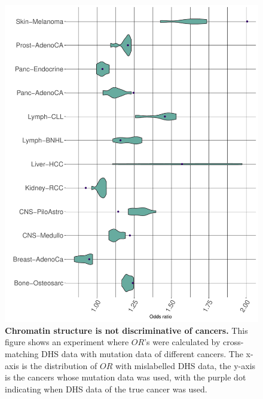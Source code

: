 \begin{figure}[ht!]
    \centering
    \includegraphics[scale=0.66]{graphics/mixed_or_violin_by_row.pdf}
    \caption{\textbf{Chromatin structure is not discriminative of cancers.} This figure shows an experiment where $OR$'s were calculated by cross-matching DHS data with mutation data of different cancers. The x-axis is the distribution of $OR$ with mislabelled DHS data, the y-axis is the cancers whose mutation data was used, with the purple dot indicating when DHS data of the true cancer was used.}
    \label{fig:mixed_or_byrow}
\end{figure}
